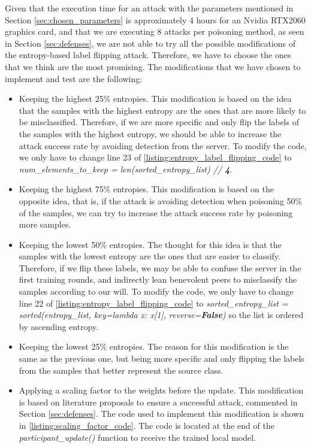 Given that the execution time for an attack with the parameters mentioned in Section \ref{sec:chosen_parameters} is approximately 4 hours for an Nvidia RTX2060 graphics card, and that we are executing 8 attacks per poisoning method, as seen in Section \ref{sec:defenses}, we are not able to try all the possible modifications of the entropy-based label flipping attack. Therefore, we have to choose the ones that we think are the most promising. The modifications that we have chosen to implement and test are the following:
\begin{itemize}
        \item Keeping the highest 25\% entropies. This modification is based on the idea that the samples with the highest entropy are the ones that are more likely to be misclassified. Therefore, if we are more specific and only flip the labels of the samples with the highest entropy, we should be able to increase the attack success rate by avoiding detection from the server. To modify the code, we only have to change line 23 of \autoref{listing:entropy_label_flipping_code} to \textit{num\_elements\_to\_keep = len(sorted\_entropy\_list) // \textbf{4}}.
        \item Keeping the highest 75\% entropies. This modification is based on the opposite idea, that is, if the attack is avoiding detection when poisoning 50\% of the samples, we can try to increase the attack success rate by poisoning more samples.
        \item Keeping the lowest 50\% entropies. The thought for this idea is that the samples with the lowest entropy are the ones that are easier to classify. Therefore, if we flip these labels, we may be able to confuse the server in the first training rounds, and indirectly lean benevolent peers to misclassify the samples according to our will. To modify the code, we only have to change line 22 of \autoref{listing:entropy_label_flipping_code} to \textit{sorted\_entropy\_list = sorted(entropy\_list, key=lambda x: x[1], reverse=\textbf{False})} so the list is ordered by ascending entropy.
        \item Keeping the lowest 25\% entropies. The reason for this modification is the same as the previous one, but being more specific and only flipping the labels from the samples that better represent the source class.
        \item Applying a scaling factor to the weights before the update. This modification is based on literature proposals to ensure a successful attack, commented in Section \ref{sec:defenses}. The code used to implement this modification is shown in \autoref{listing:scaling_factor_code}. The code is located at the end of the \textit{participant\_update()} function to receive the trained local model.
\end{itemize}

